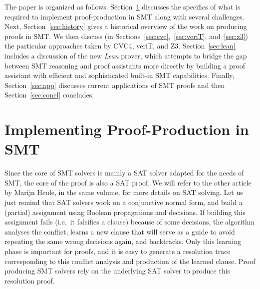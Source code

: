 \documentclass{llncs}
\newcommand{\Note}[1]{\textcolor{blue}{[#1]}}
\begin{document}
The paper is organized as follows.  Section~\ref{sec:impl} discusses the
specifics of what is required to implement proof-production in SMT along with
several challenges.  Next, Section~\ref{sec:history} gives a historical
overview of the work on producing proofs in SMT.  We then discuss (in
Sections~\ref{sec:cvc},~\ref{sec:veriT}, and~\ref{sec:z3}) the particular
approaches taken by CVC4, veriT, and Z3. Section~\ref{sec:lean} includes a
discussion of the new \emph{Lean} prover, which attempts to bridge the gap
between SMT reasoning and proof assistants more directly by building a proof
assistant with efficient and sophisticated built-in SMT capabilities.  Finally,
Section~\ref{sec:app} discusses current applications of SMT proofs and then
Section~\ref{sec:concl} concludes.







\section{Implementing Proof-Production in SMT}
\label{sec:impl}

Since the core of SMT solvers is mainly a SAT solver adapted for the needs of
SMT, the core of the proof is also a SAT proof.  We will refer to the other
article by Marijn Heule, in the same volume, for more details on SAT solving.
Let us just remind that SAT solvers work on a conjunctive normal form, and build
a (partial) assignment using Boolean propagations and decisions.  If building
this assignment fails (i.e.\ it falsifies a clause) because of some decisions,
the algorithm analyses the conflict, learns a new clause that will serve as a
guide to avoid repeating the same wrong decisions again, and backtracks.  Only
this learning phase is important for proofs, and it is easy to generate a
resolution trace corresponding to this conflict analysis and production of the
learned clause.  Proof producing SMT solvers rely on the underlying SAT solver
to produce this resolution proof.
\end{document}
